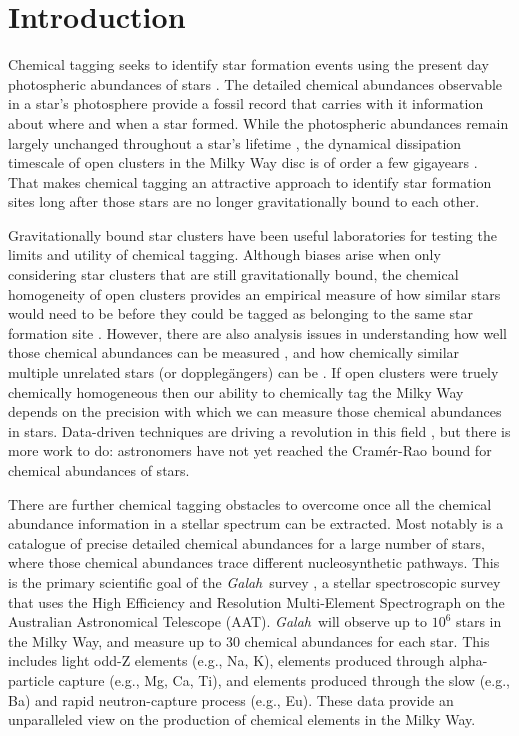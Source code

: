 \documentclass[twocolumn]{aastex62}
\newcommand{\project}[1]{\textsl{#1}}
\newcommand{\Galah}{\project{Galah}}
\begin{document}

\section{Introduction} \label{sec:intro}

Chemical tagging seeks to identify star formation events using the present
day photospheric abundances of stars \citep{Freeman;Bland-Hawthorn:2002}.
The detailed chemical abundances observable in a star's photosphere provide a
fossil record that carries with it information about where and when a star
formed. While the photospheric abundances remain largely unchanged throughout
a star's lifetime \citep[however see][]{Dotter:2017,Ness:2018b}, the dynamical 
dissipation timescale of open clusters in the Milky Way disc is of order a few 
gigayears \citep{Portegies-Zwart:1998}. That makes chemical tagging an attractive 
approach to identify star formation sites long after those stars are no longer 
gravitationally bound to each other.


Gravitationally bound star clusters have been useful laboratories for
testing the limits and utility of chemical tagging. Although biases arise when
only considering star clusters that are still gravitationally bound, the chemical
homogeneity of open clusters provides an empirical measure of how similar stars
would need to be before they could be tagged as belonging to the same
star formation site \citep{Mitschang:2014}. However, there are also analysis
issues in understanding how well those chemical abundances can be measured
\citep{Bovy:2016}, and how chemically similar multiple unrelated stars (or
doppleg\"angers) can be \citep{Ness:2018}.
If open clusters were truely chemically homogeneous then our
ability to chemically tag the Milky Way depends on the precision with which we
can measure those chemical abundances in stars. Data-driven techniques are
driving a revolution in this field \citep{Ness:2015,Ness:2018a,Ness:2018b,
Casey:2016,Casey:2017,Ho:2017b,Ho:2017a,Leung;Bovy:2018}, but there is more work
to do: astronomers have not yet reached the Cram\'er-Rao bound for chemical 
abundances of stars.


There are further chemical tagging obstacles to overcome once all the chemical 
abundance information in a stellar spectrum can be extracted. Most notably is a 
catalogue of precise detailed chemical abundances for a large number of stars,
where those chemical abundances trace different nucleosynthetic pathways.
This is the primary scientific goal of the \Galah\ survey \citep{DeSilva:2015,Martell:2017,Buder:2018},
a stellar spectroscopic survey that uses the High Efficiency and Resolution 
Multi-Element Spectrograph \citep[\project{HERMES};][]{Sheinis:2015} on the Australian 
Astronomical Telescope (AAT).  \Galah\ will observe up to $10^6$ stars in the 
Milky Way, and measure up to 30 chemical abundances for each star. This includes
light odd-Z elements (e.g., Na, K), elements produced through
alpha-particle capture (e.g., Mg, Ca, Ti), and elements produced
through the slow (e.g., Ba) and rapid neutron-capture process
(e.g., Eu). These data provide an unparalleled view on the production
of chemical elements in the Milky Way.
\end{document}
